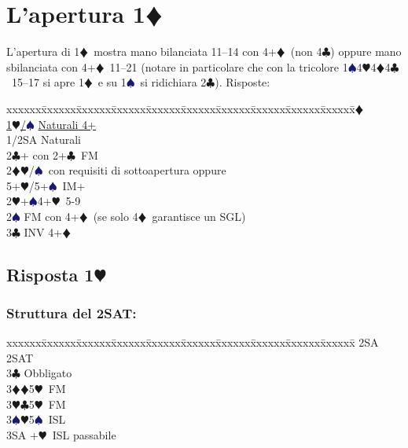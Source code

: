 \documentclass[a4paper,italian]{article}
\newcommand{\BC}{\textcolor{OliveGreen}{$\clubsuit$}}
\newcommand{\BD}{\textcolor{RedOrange}{$\vardiamondsuit$}}
\newcommand{\BH}{\textcolor{Red2}{$\varheartsuit${}}}
\newcommand{\BS}{\textcolor{MidnightBlue}{$\spadesuit${}}}
\newcommand{\pdfd}{\texorpdfstring{\BD{}}{D}}
\newcommand{\pdfh}{\texorpdfstring{\BH{}}{H}}
\newenvironment{bidtable}
{\begin{tabbing}

    xxxxxx\=xxxxxx\=xxxxxx\=xxxxxx\=xxxxxx\=xxxxxx\=xxxxxx\=xxxxxx\=xxxxxx\=xxxxxx\=\kill}
{\end{tabbing} }%
\begin{document}
                                    \section{L'apertura 1\pdfd}
                                    \begin{multicols}{2}
                                        L'apertura di 1\BD\ mostra mano bilanciata 11--14 con 4+\BD\ (non 4\BC ) oppure mano sbilanciata con 4+\BD\ 11--21 (notare in particolare che con la tricolore 1\BS 4\BH 4\BD 4\BC\ 15--17  si apre 1\BD\ e su 1\BS\ si ridichiara 2\BC ).
                                        Risposte:
                                        \begin{bidtable}
                                            1\BD\+\\
                                            \hyperref[fissaggi]{1\BH/\BS} \> \hyperref[fissaggi]{Naturali 4+}\\
                                            1/2SA \> Naturali\\
                                            2\BC {}+ con 2+\BC\ FM\\
                                            2\BD {}\BH /\BS\ con requisiti di sottoapertura oppure\+\\5+\BH /5+\BS\ IM+\-\\
                                            2\BH {}+\BS 4+\BH\ 5-9\\
                                            2\BS \> FM con 4+\BD\ (se solo 4\BD\ garantisce un SGL)\\
                                            3\BC \> INV 4+\BD \-
                                        \end{bidtable}
                                        \bigbreak
                                        \subsection{Risposta 1\pdfh}

                                        \subsubsection{Struttura del 2SAT:}

                                        \begin{bidtable}
                                            2SA \> 2SAT\+\\
                                            3\BC \> Obbligato\+\\
                                            3\BD {}\BD 5\BH\ FM\\
                                            3\BH {}\BC 5\BH\ FM\\
                                            3\BS {}\BH 5\BS\ ISL\\
                                            3SA +\BH\ ISL passabile\-\-
                                        \end{bidtable}

\end{multicols}
\end{document}
